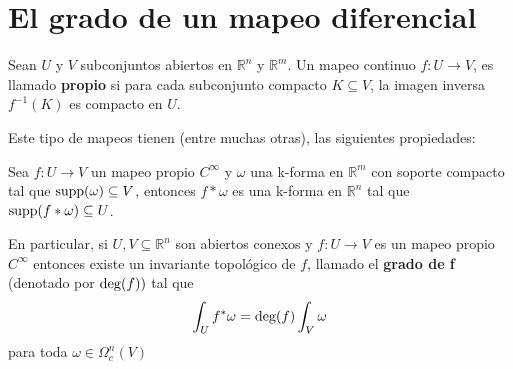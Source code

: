 \documentclass[12pt]{report}
\theoremstyle{largebreak}
\begin{document}
    \section{El grado de un mapeo diferencial}

    \begin{mydef}
        Sean $U$ y $V$ subconjuntos abiertos en $\mathbb{R}^n$ y $\mathbb{R}^m$. Un mapeo continuo $f:U\rightarrow V$, es llamado \textbf{propio} si para cada subconjunto compacto $K\subseteq V$, la imagen inversa $f^{-1}(K)$ es compacto en $U$.
    \end{mydef}

    Este tipo de mapeos tienen (entre muchas otras), las siguientes propiedades:

    \begin{obs}
        Sea $f:U\rightarrow V$ un mapeo propio $C^{\infty}$ y $\omega$ una k-forma en $\mathbb{R}^m$ con soporte compacto tal que $\textup{supp}(\omega)\subseteq V$, entonces $f*\omega$ es una k-forma en $\mathbb{R}^n$ tal que $\textup{supp}(f*\omega)\subseteq U$.
    \end{obs}

    En particular, si $U,V\subseteq \mathbb{R}^n$ son abiertos conexos y $f:U\rightarrow V$ es un mapeo propio $C^{\infty}$ entonces existe un invariante topológico de $f$, llamado el \textbf{grado de f} (denotado por $\textup{deg}(f))$ tal que
    \begin{equation*}
        \int_{U}f^*\omega=\textup{deg}(f)\int_{V}\omega
    \end{equation*}
    para toda $\omega\in\Omega_c^n(V)$
\end{document}
